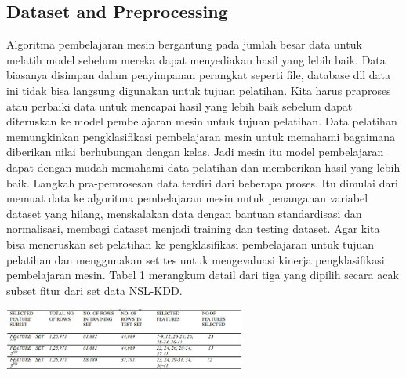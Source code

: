 \documentclass[conference]{IEEEtran}
\begin{document}
\subsection{Dataset and Preprocessing}
Algoritma pembelajaran mesin bergantung pada jumlah besar data untuk melatih model sebelum mereka dapat menyediakan hasil yang lebih baik. Data biasanya disimpan dalam penyimpanan perangkat seperti file, database dll data ini tidak bisa langsung digunakan untuk tujuan pelatihan. Kita harus praproses atau perbaiki data untuk mencapai hasil yang lebih baik sebelum dapat diteruskan ke model pembelajaran mesin untuk tujuan pelatihan. Data pelatihan memungkinkan pengklasifikasi pembelajaran mesin untuk memahami bagaimana diberikan nilai berhubungan dengan kelas. Jadi mesin itu model pembelajaran dapat dengan mudah memahami data pelatihan dan memberikan hasil yang lebih baik. Langkah pra-pemrosesan data terdiri dari beberapa proses. Itu dimulai dari memuat data ke algoritma pembelajaran mesin untuk penanganan variabel dataset yang hilang, menskalakan data dengan bantuan standardisasi dan normalisasi, membagi dataset menjadi training dan testing dataset. Agar kita bisa meneruskan set pelatihan ke pengklasifikasi pembelajaran untuk tujuan pelatihan dan menggunakan set tes untuk mengevaluasi kinerja pengklasifikasi pembelajaran mesin. Tabel 1 merangkum detail dari tiga yang dipilih secara acak subset fitur dari set data NSL-KDD.

\begin{minipage}{\linewidth}
\centerline{\includegraphics[width=80mm]{Gambar/gambar1.JPG}}
\label{fig2}
\end{minipage}
\end{document}
